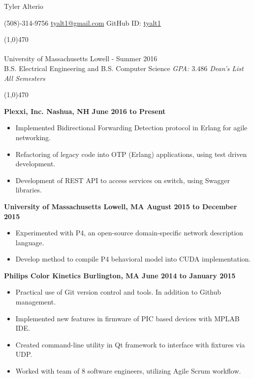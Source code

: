 \documentclass[11pt, a4paper]{article} %
\newcommand{\tinybullet}{ {\tiny \textbullet} }
\begin{document}
\centerline{\Huge \sc Tyler Alterio}

\centerline{
(508)-314-9756 \tinybullet \hspace{1pt}
\href{mailto:tyalt1@gmail.com}{tyalt1@gmail.com} \tinybullet \hspace{1pt}
GitHub ID: \href{http://www.github.com/tyalt1}{tyalt1}
}

\noindent \line(1,0){470}\\

\smallskip \\
University of Massachusetts Lowell - Summer 2016 \\
B.S. Electrical Engineering and B.S. Computer Science
\hfill {\it GPA: $3.486$ \tinybullet \hspace{1pt} Dean's List All Semesters}

\noindent \line(1,0){470}\\

\vspace{5pt}

\centerline{\bf Plexxi, Inc. \tinybullet \hspace{1pt} Nashua, NH \hfill June 2016 to Present}
\begin{itemize}
\itemsep0em
	\item Implemented Bidirectional Forwarding Detection protocol in Erlang for agile networking.
	\item Refactoring of legacy code into OTP (Erlang) applications, using test driven development.
	\item Development of REST API to access services on switch, using Swagger libraries.
\end{itemize}

\centerline{\bf University of Massachusetts \tinybullet \hspace{1pt} Lowell, MA \hfill August 2015 to December 2015}
\begin{itemize}
\itemsep0em
	\item Experimented with P4, an open-source domain-specific network description language.
	\item Develop method to compile P4 behavioral model into CUDA implementation.
\end{itemize}

\centerline{\bf Philips Color Kinetics \tinybullet \hspace{1pt} Burlington, MA \hfill June 2014 to January 2015}
\begin{itemize}
\itemsep0em
	\item Practical use of Git version control and tools. In addition to Github management.
	\item Implemented new features in firmware of PIC based devices with MPLAB IDE.
	\item Created command-line utility in Qt framework to interface with fixtures via UDP.
	\item Worked with team of 8 software engineers, utilizing Agile Scrum workflow.
\end{itemize}
\end{document}
